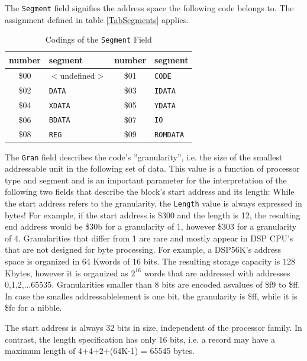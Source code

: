 \documentclass[12pt,twoside]{report}
\newcommand{\tty}[1]{{\tt #1}}
\begin{document}
The \tty{Segment} field signifies the address space the following code
belongs to.  The assignment defined in table \ref{TabSegments} applies.
\begin{table}[htbp]
\begin{center}\begin{tabular}{|c|l||c|l|}
\hline
number  & segment               & number  & segment \\
\hline
\hline
\$00    & $<$undefined$>$       & \$01    & \tty{CODE} \\
\$02    & \tty{DATA}            & \$03    & \tty{IDATA} \\
\$04    & \tty{XDATA}           & \$05    & \tty{YDATA} \\
\$06    & \tty{BDATA}           & \$07    & \tty{IO} \\
\$08    & \tty{REG}             & \$09    & \tty{ROMDATA} \\
\hline
\end{tabular}\end{center}
\caption{Codings of the {\tt Segment} Field\label{TabSegments}
         \label{TabSegmentNums}}
\end{table}
The \tty{Gran} field describes the code's ''granularity'', i.e. the size of
the smallest addressable unit in the following set of data.  This
value is a function of processor type and segment and is an important
parameter for the interpretation of the following two fields that
describe the block's start address and its length: While the start
address refers to the granularity, the \tty{Length} value is always
expressed in bytes!  For example, if the start address is \$300 and
the length is 12, the resulting end address would be \$30b for a
granularity of 1, however \$303 for a granularity of 4.  Granularities
that differ from 1 are rare and mostly appear in DSP CPU's that are
not designed for byte processing.  For example, a DSP56K's address
space is organized in 64 Kwords of 16 bits.  The resulting storage
capacity is 128 Kbytes, however it is organized as $2^{16}$ words that
are addressed with addresses 0,1,2,...65535.  Granularities
smaller than 8 bits are encoded asvalues of \$f9 to \$ff.  In case
the smalles addressablelement is one bit, the granularity is \$ff,
while it is \$fc for a nibble.

The start address is always 32 bits in size, independent of the
processor family.  In contrast, the length specification has only 16
bits, i.e. a record may have a maximum length of 4+4+2+(64K-1) =
65545 bytes.
\end{document}
